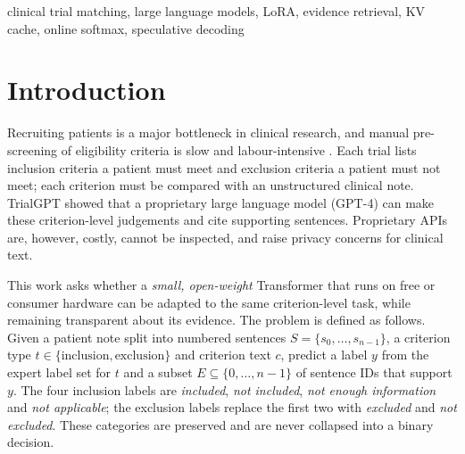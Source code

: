 \documentclass[conference]{IEEEtran}
\begin{document}
\begin{IEEEkeywords}
clinical trial matching, large language models, LoRA, evidence retrieval, KV cache, online softmax, speculative decoding
\end{IEEEkeywords}

\section{Introduction}
Recruiting patients is a major bottleneck in clinical research, and manual pre-screening of eligibility criteria is slow and labour-intensive \cite{jin2024trialgpt}. Each trial lists inclusion criteria a patient must meet and exclusion criteria a patient must not meet; each criterion must be compared with an unstructured clinical note. TrialGPT \cite{jin2024trialgpt} showed that a proprietary large language model (GPT-4) can make these criterion-level judgements and cite supporting sentences. Proprietary APIs are, however, costly, cannot be inspected, and raise privacy concerns for clinical text.

This work asks whether a \emph{small, open-weight} Transformer that runs on free or consumer hardware can be adapted to the same criterion-level task, while remaining transparent about its evidence. The problem is defined as follows. Given a patient note split into numbered sentences $S=\{s_0,\dots,s_{n-1}\}$, a criterion type $t\in\{\text{inclusion},\text{exclusion}\}$ and criterion text $c$, predict a label $y$ from the expert label set for $t$ and a subset $E\subseteq\{0,\dots,n-1\}$ of sentence IDs that support $y$. The four inclusion labels are \emph{included}, \emph{not included}, \emph{not enough information} and \emph{not applicable}; the exclusion labels replace the first two with \emph{excluded} and \emph{not excluded}. These categories are preserved and are never collapsed into a binary decision.
\end{document}
